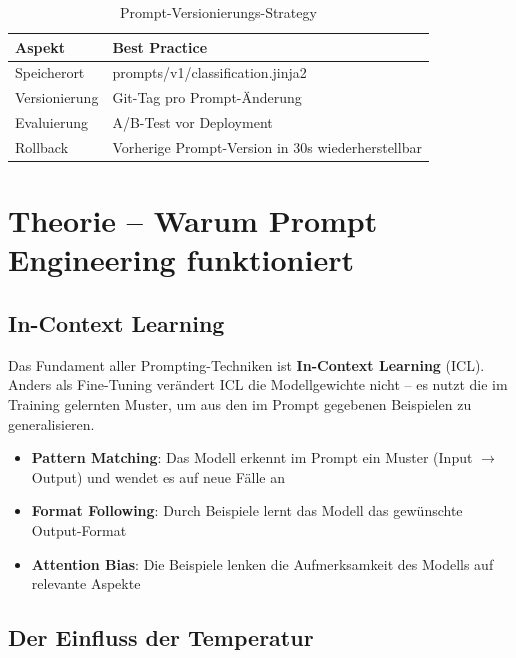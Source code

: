 \begin{table}[H]
\centering
\begin{tabularx}{\linewidth}{lX}
\toprule
\textbf{Aspekt} & \textbf{Best Practice} \\
\midrule
Speicherort & prompts/v1/classification.jinja2 \\
Versionierung & Git-Tag pro Prompt-Änderung \\
Evaluierung & A/B-Test vor Deployment \\
Rollback & Vorherige Prompt-Version in 30s wiederherstellbar \\
\midrule
\end{tabularx}
\caption{Prompt-Versionierungs-Strategy}
\label{tab:prompt-versioning}
\end{table}

\section{Theorie -- Warum Prompt Engineering funktioniert}

\subsection{In-Context Learning}

Das Fundament aller Prompting-Techniken ist \textbf{In-Context Learning} (ICL). Anders als Fine-Tuning verändert ICL die Modellgewichte nicht -- es nutzt die im Training gelernten Muster, um aus den im Prompt gegebenen Beispielen zu generalisieren.

\begin{itemize}[leftmargin=*]
    \item \textbf{Pattern Matching}: Das Modell erkennt im Prompt ein Muster (Input $\rightarrow$ Output) und wendet es auf neue Fälle an
    \item \textbf{Format Following}: Durch Beispiele lernt das Modell das gewünschte Output-Format
    \item \textbf{Attention Bias}: Die Beispiele lenken die Aufmerksamkeit des Modells auf relevante Aspekte
\end{itemize}

\subsection{Der Einfluss der Temperatur}

